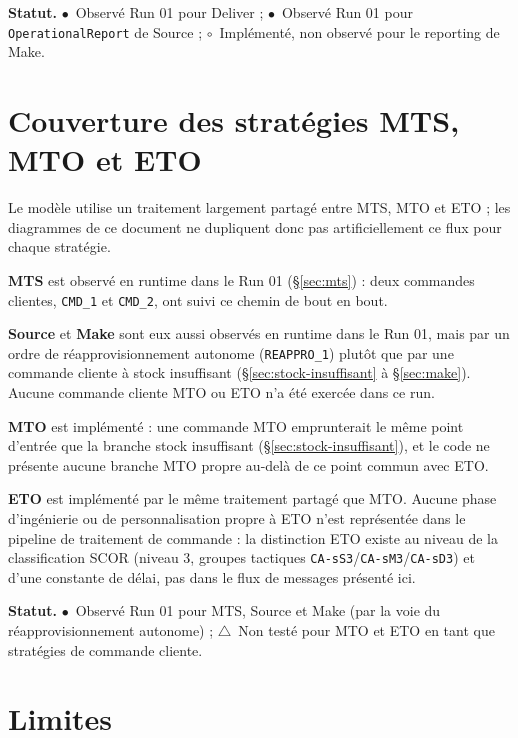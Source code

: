 \documentclass[11pt,a4paper]{article}
\newcommand{\code}[1]{\texttt{#1}}
\newcommand{\stRUN}{\ensuremath{\bullet}~Observé Run 01}
\newcommand{\stIMP}{\ensuremath{\circ}~Implémenté, non observé}
\newcommand{\stNT}{\ensuremath{\triangle}~Non testé}
\newcommand{\statut}[1]{\textbf{Statut.} #1}
\begin{document}
\statut{\stRUN{} pour Deliver ; \stRUN{} pour \code{OperationalReport} de Source ; \stIMP{} pour le reporting de Make.}

\section{Couverture des stratégies MTS, MTO et ETO}
\label{sec:mts-mto-eto}

Le modèle utilise un traitement largement partagé entre MTS, MTO et ETO ; les diagrammes de ce document ne dupliquent donc pas artificiellement ce flux pour chaque stratégie.

\textbf{MTS} est observé en runtime dans le Run 01 (\S\ref{sec:mts}) : deux commandes clientes, \code{CMD\_1} et \code{CMD\_2}, ont suivi ce chemin de bout en bout.

\textbf{Source} et \textbf{Make} sont eux aussi observés en runtime dans le Run 01, mais par un ordre de réapprovisionnement autonome (\code{REAPPRO\_1}) plutôt que par une commande cliente à stock insuffisant (\S\ref{sec:stock-insuffisant} à \S\ref{sec:make}). Aucune commande cliente MTO ou ETO n'a été exercée dans ce run.

\textbf{MTO} est implémenté : une commande MTO emprunterait le même point d'entrée que la branche stock insuffisant (\S\ref{sec:stock-insuffisant}), et le code ne présente aucune branche MTO propre au-delà de ce point commun avec ETO.

\textbf{ETO} est implémenté par le même traitement partagé que MTO. Aucune phase d'ingénierie ou de personnalisation propre à ETO n'est représentée dans le pipeline de traitement de commande : la distinction ETO existe au niveau de la classification SCOR (niveau 3, groupes tactiques \code{CA-sS3}/\code{CA-sM3}/\code{CA-sD3}) et d'une constante de délai, pas dans le flux de messages présenté ici.

\statut{\stRUN{} pour MTS, Source et Make (par la voie du réapprovisionnement autonome) ; \stNT{} pour MTO et ETO en tant que stratégies de commande cliente.}

\section{Limites}
\label{sec:limites}
\end{document}
